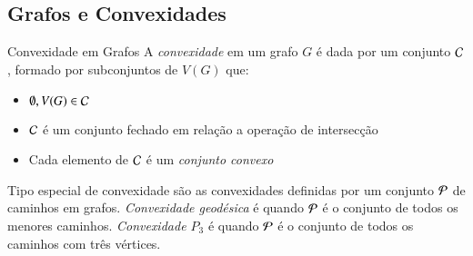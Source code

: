 \subsection{Grafos e Convexidades}
\begin{frame}{Convexidade em Grafos}
A \textit{convexidade} em um grafo $G$ é dada por um conjunto ${\cal C}$, formado por subconjuntos de $V(G)$ que:
\begin{itemize}
    \item$\emptyset,V(G) \in {\cal C}$
    \item ${\cal C}$ é um conjunto fechado em relação a operação de intersecção
    \item Cada elemento de ${\cal C}$ é um \textit{conjunto convexo}
\end{itemize}
Tipo especial de convexidade são as convexidades definidas por um conjunto ${\cal P}$ de caminhos em grafos. 
\textit{Convexidade geodésica} é quando ${\cal P}$ é o conjunto de todos os menores caminhos.
\textit{Convexidade $P_3$} é quando ${\cal P}$ é o conjunto de todos os caminhos com três vértices.
\end{frame}

